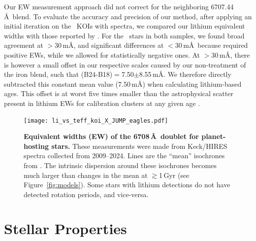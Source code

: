 \documentclass[11pt,twocolumn,tighten]{aastex63}
\begin{document}
Our EW measurement approach did not correct for the neighboring
 6707.44\,\AA\ blend.  To evaluate the accuracy and
precision of our method, after applying an initial
iteration on the \nlithiumstars\ KOIs with spectra, we compared our
lithium equivalent widths with those reported by
\citet{2018ApJ...855..115B}.  For the \nbergeroverlap\ stars in both
samples, we found broad agreement at $>$30\,m\AA, and significant
differences at $<$30\,m\AA\ because \citet{2018ApJ...855..115B}
required positive EWs, while we allowed for statistically negative ones.  At
$>$30\,m\AA, there is however a small offset in our respective scales caused
by our non-treatment of the iron blend,
such that (B24-B18)$=$7.50$\pm$8.55\,m\AA.
We therefore directly subtracted
this constant mean value (7.50\,m\AA) when calculating lithium-based
ages.  This offset is at worst five times smaller than the astrophysical
scatter present in lithium EWs for calibration clusters at any given age
\citep[see][]{Jeffries_2023}.


\begin{figure}[!t]
	\begin{center}
		\leavevmode
		\texttt{[image: li\_vs\_teff\_koi\_X\_JUMP\_eagles.pdf]}
	\end{center}
	\vspace{-0.25cm}
	\caption{{\bf Equivalent widths (EW) of the  6708\,\AA\ doublet
    for planet-hosting stars.} These measurements were made from
    Keck/HIRES spectra collected from 2009--2024.  Lines are the ``mean''
    isochrones from \citet{Jeffries_2023}.  The
    intrinsic dispersion around these isochrones becomes much larger
    than changes in the mean at $\gtrsim$1\,Gyr (see
    Figure~\ref{fig:models}).  Some stars with lithium detections do
    not have detected rotation periods, and vice-versa.
		\label{fig:li_vs_teff}
	}
\end{figure}



\section{Stellar Properties}
\label{sec:stellarprops}



\end{document}
